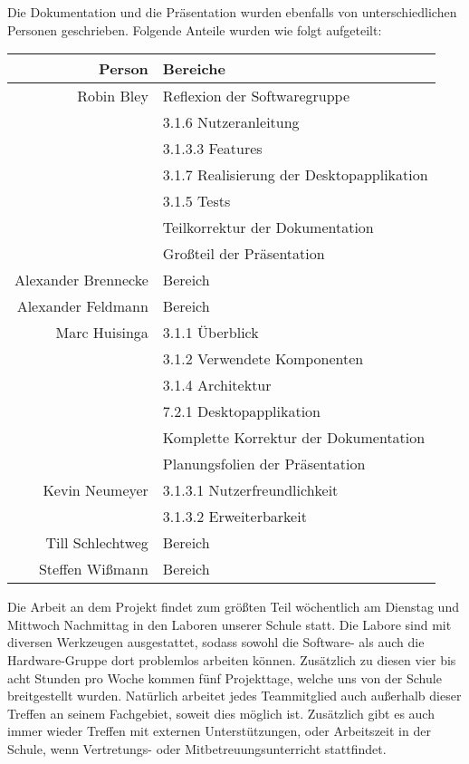 Die Dokumentation und die Präsentation wurden ebenfalls von unterschiedlichen Personen geschrieben. Folgende Anteile wurden wie folgt aufgeteilt:

\begin{table}[H]
	\centering
	\begin{tabular}{rl}
		\toprule
		\textbf{Person} & \textbf{Bereiche} \\
		\midrule
		Robin Bley & Reflexion der Softwaregruppe \\
		 & 3.1.6 Nutzeranleitung \\
		 & 3.1.3.3 Features \\
		 & 3.1.7 Realisierung der Desktopapplikation \\
		 & 3.1.5 Tests \\
		 & Teilkorrektur der Dokumentation \\
		 & Großteil der Präsentation \\
		Alexander Brennecke & Bereich \\
		Alexander Feldmann & Bereich \\
		Marc Huisinga & 3.1.1 Überblick \\
		 & 3.1.2 Verwendete Komponenten \\
		 & 3.1.4 Architektur \\
		 & 7.2.1 Desktopapplikation \\
		 & Komplette Korrektur der Dokumentation \\
		 & Planungsfolien der Präsentation \\
		Kevin Neumeyer & 3.1.3.1 Nutzerfreundlichkeit \\
		 & 3.1.3.2 Erweiterbarkeit \\
		Till Schlechtweg & Bereich \\
		Steffen Wißmann & Bereich \\
		\bottomrule
	\end{tabular}
\end{table}

Die Arbeit an dem Projekt findet zum größten Teil wöchentlich am Dienstag und Mittwoch Nachmittag in den Laboren unserer Schule statt. Die Labore sind mit diversen Werkzeugen ausgestattet, sodass sowohl die Software- als auch die Hardware-Gruppe dort problemlos arbeiten können. Zusätzlich zu diesen vier bis acht Stunden pro Woche kommen fünf Projekttage, welche uns von der Schule breitgestellt wurden. Natürlich arbeitet jedes Teammitglied auch außerhalb dieser Treffen an seinem Fachgebiet, soweit dies möglich ist. Zusätzlich gibt es auch immer wieder Treffen mit externen Unterstützungen, oder Arbeitszeit in der Schule, wenn Vertretungs- oder Mitbetreuungsunterricht stattfindet.

